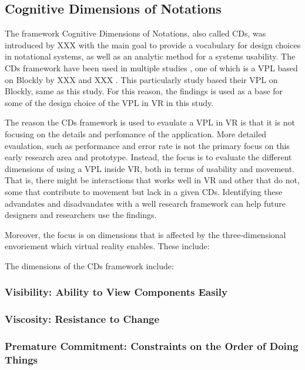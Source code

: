 \documentclass[screen, sigcconf]{timtm}
\begin{document}
\subsection{Cognitive Dimensions of Notations}
The framework Cognitive Dimensions of Notations, also called CDs, was introduced by XXX with the main goal to provide a vocabulary for design choices in notational systems, as well as an analytic method for a systems usability. The CDs framework have been used in multiple studies \cite{hadhrawi_systematic_nodate}, one of which is a VPL based on Blockly by XXX and XXX \cite{holwerda_usability_2018}. This particularly study based their VPL on Blockly, same as this study. For this reason, the findings is used as a base for some of the design choice of the VPL in VR in this study.

The reason the CDs framework is used to evaulate a VPL in VR is that it is not focusing on the details and perfomance of the application. More detailed evaulation, such as performance and error rate is not the primary focus on this early research area and prototype. Instead, the focus is to evaluate the different dimensions of using a VPL inside VR, both in terms of usability and movement. That is, there might be interactions that works well in VR and other that do not, some that contribute to movement but lack in a given CDs. Identifying these advandates and disadvandates with a well research framework can help future designers and researchers use the findings. 

Moreover, the focus is on dimensions that is affected by the three-dimensional envoriement which virtual reality enables. These include:

The dimensions of the CDs framework include:

\subsubsection{Visibility: Ability to View Components Easily}

\subsubsection{Viscosity: Resistance to Change}

\subsubsection{Premature Commitment: Constraints on the Order of Doing Things}
\end{document}
